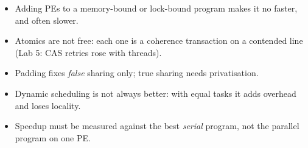 \begin{trap}
\begin{itemize}
\item Adding PEs to a memory-bound or lock-bound program makes it no faster, and often slower.
\item Atomics are not free: each one is a coherence transaction on a contended line (Lab 5: CAS retries rose with threads).
\item Padding fixes \emph{false} sharing only; true sharing needs privatisation.
\item Dynamic scheduling is not always better: with equal tasks it adds overhead and loses locality.
\item Speedup must be measured against the best \emph{serial} program, not the parallel program on one PE.
\end{itemize}
\end{trap}
